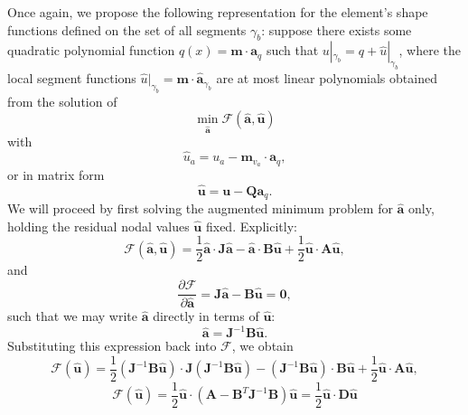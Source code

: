\documentclass[12pt]{article}
\begin{document}
Once again, we propose the following representation for the element's shape functions defined on the set of all segments $\gamma_b$: suppose there exists some quadratic polynomial function $q(x) = \mathbf{m} \cdot \mathbf{a}_q$ such that $u |_{\gamma_b} = q + \hat{u} |_{\gamma_b}$, where the local segment functions $\hat{u} |_{\gamma_b} = \mathbf{m} \cdot \hat{\mathbf{a}}_{\gamma_b}$ are at most linear polynomials obtained from the solution of
\begin{equation}
	\min_{\hat{\mathbf{a}}} \mathcal{F} (\hat{\mathbf{a}}, \hat{\mathbf{u}})
\end{equation}
with
\begin{equation}
	\hat{u}_a = u_a - \mathbf{m}_{v_a} \cdot \mathbf{a}_q,
\end{equation}
or in matrix form
\begin{equation}
	\hat{\mathbf{u}} = \mathbf{u} - \mathbf{Q} \mathbf{a}_q.
\end{equation}
We will proceed by first solving the augmented minimum problem for $\hat{\mathbf{a}}$ only, holding the residual nodal values $\hat{\mathbf{u}}$ fixed. Explicitly:
\begin{equation}
        \mathcal{F} (\hat{\mathbf{a}}, \hat{\mathbf{u}}) = \frac{1}{2} \hat{\mathbf{a}} \cdot \mathbf{J} \hat{\mathbf{a}} - \hat{\mathbf{a}} \cdot \mathbf{B} \hat{\mathbf{u}} + \frac{1}{2} \hat{\mathbf{u}} \cdot \mathbf{A} \hat{\mathbf{u}},
\end{equation}
and
\begin{equation}
	\frac{\partial \mathcal{F}}{\partial \hat{\mathbf{a}}} = \mathbf{J} \hat{\mathbf{a}} - \mathbf{B} \hat{\mathbf{u}} = \mathbf{0},
\end{equation}
such that we may write $\hat{\mathbf{a}}$ directly in terms of $\hat{\mathbf{u}}$:
\begin{equation}
	\hat{\mathbf{a}} = \mathbf{J}^{-1} \mathbf{B} \hat{\mathbf{u}}.
\end{equation}
Substituting this expression back into $\mathcal{F}$, we obtain
\begin{equation}
        \mathcal{F} (\hat{\mathbf{u}}) = \frac{1}{2} (\mathbf{J}^{-1} \mathbf{B} \hat{\mathbf{u}}) \cdot \mathbf{J} (\mathbf{J}^{-1} \mathbf{B} \hat{\mathbf{u}}) - (\mathbf{J}^{-1} \mathbf{B} \hat{\mathbf{u}}) \cdot \mathbf{B} \hat{\mathbf{u}} + \frac{1}{2} \hat{\mathbf{u}} \cdot \mathbf{A} \hat{\mathbf{u}},
\end{equation}
\begin{equation}
        \mathcal{F} (\hat{\mathbf{u}}) = \frac{1}{2} \hat{\mathbf{u}} \cdot (\mathbf{A} - \mathbf{B}^T \mathbf{J}^{-1} \mathbf{B}) \hat{\mathbf{u}} = \frac{1}{2} \hat{\mathbf{u}} \cdot \mathbf{D} \hat{\mathbf{u}}
\end{equation}
\end{document}
